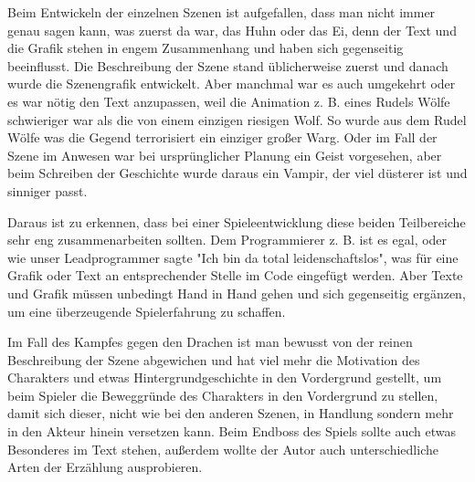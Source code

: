 Beim Entwickeln der einzelnen Szenen ist aufgefallen, dass man nicht immer genau sagen kann, was zuerst da war, das Huhn oder das Ei, denn der Text und die Grafik stehen in engem Zusammenhang und haben sich gegenseitig beeinflusst. Die Beschreibung der Szene stand üblicherweise zuerst und danach wurde die Szenengrafik entwickelt. Aber manchmal war es auch umgekehrt oder es war nötig den Text anzupassen, weil die Animation z. B. eines Rudels Wölfe schwieriger war als die von einem einzigen riesigen Wolf. So wurde aus dem Rudel Wölfe was die Gegend terrorisiert ein einziger großer Warg. Oder im Fall der Szene im Anwesen war bei ursprünglicher Planung ein Geist vorgesehen, aber beim Schreiben der Geschichte wurde daraus ein Vampir, der viel düsterer ist und sinniger passt.

Daraus ist zu erkennen, dass bei einer Spieleentwicklung diese beiden Teilbereiche sehr eng zusammenarbeiten sollten. Dem Programmierer z. B. ist es egal, oder wie unser Leadprogrammer sagte "Ich bin da total leidenschaftslos", was für eine Grafik oder Text an entsprechender Stelle im Code eingefügt werden. Aber Texte und Grafik müssen unbedingt Hand in Hand gehen und sich gegenseitig ergänzen, um eine überzeugende Spielerfahrung zu schaffen. 

Im Fall des Kampfes gegen den Drachen ist man bewusst von der reinen Beschreibung der Szene abgewichen und hat viel mehr die Motivation des Charakters und etwas Hintergrundgeschichte in den Vordergrund gestellt, um beim Spieler die Beweggründe des Charakters in den Vordergrund zu stellen, damit sich dieser, nicht wie bei den anderen Szenen, in Handlung sondern mehr in den Akteur hinein versetzen kann. Beim Endboss des Spiels sollte auch etwas Besonderes im Text stehen, außerdem wollte der Autor auch unterschiedliche Arten der Erzählung ausprobieren.
